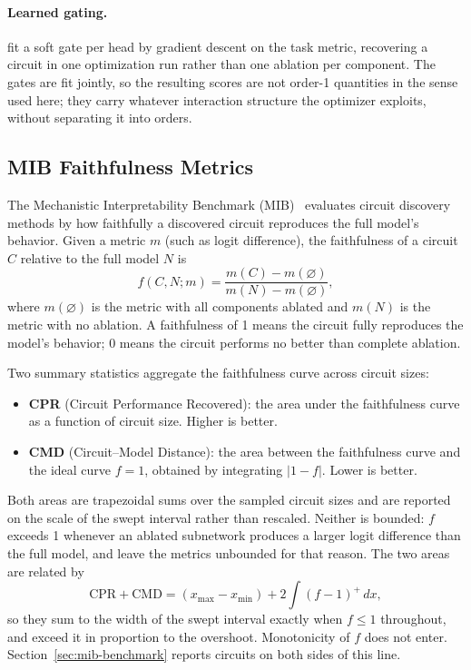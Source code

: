 \documentclass{article}
\begin{document}
\paragraph{Learned gating.}

\citet{chen2025causalheadgating} fit a soft gate per head by gradient
descent on the task metric, recovering a circuit in one optimization run
rather than one ablation per component. The gates are fit jointly, so the
resulting scores are not order-1 quantities in the sense used here; they
carry whatever interaction structure the optimizer exploits, without
separating it into orders.

\subsection{MIB Faithfulness Metrics}
\label{sec:mib-metrics}

The Mechanistic Interpretability Benchmark
(MIB)~\citep{mueller2025mib} evaluates circuit discovery methods by how
faithfully a discovered circuit reproduces the full model's behavior.
Given a metric $m$ (such as logit difference), the faithfulness of a
circuit $C$ relative to the full model $N$ is
\begin{equation}
  f(C, N; m) = \frac{m(C) - m(\varnothing)}{m(N) - m(\varnothing)},
  \label{eq:faithfulness}
\end{equation}
where $m(\varnothing)$ is the metric with all components ablated and
$m(N)$ is the metric with no ablation. A faithfulness of 1 means the
circuit fully reproduces the model's behavior; 0 means the circuit
performs no better than complete ablation.

Two summary statistics aggregate the faithfulness curve across circuit
sizes:

\begin{itemize}
\item \textbf{CPR} (Circuit Performance Recovered): the area under the
  faithfulness curve as a function of circuit size. Higher is better.

\item \textbf{CMD} (Circuit--Model Distance): the area between the
  faithfulness curve and the ideal curve $f = 1$, obtained by integrating
  $|1 - f|$. Lower is better.
\end{itemize}

Both areas are trapezoidal sums over the sampled circuit sizes and are
reported on the scale of the swept interval rather than rescaled.
Neither is bounded: $f$ exceeds 1 whenever an ablated subnetwork produces
a larger logit difference than the full model, and \citet{mueller2025mib}
leave the metrics unbounded for that reason. The two areas are related by
\begin{equation}
  \text{CPR} + \text{CMD} = (x_{\max} - x_{\min}) + 2\int (f - 1)^{+}\,dx,
  \label{eq:cpr-cmd}
\end{equation}
so they sum to the width of the swept interval exactly when $f \le 1$
throughout, and exceed it in proportion to the overshoot. Monotonicity of
$f$ does not enter. Section~\ref{sec:mib-benchmark} reports circuits on
both sides of this line.
\end{document}
